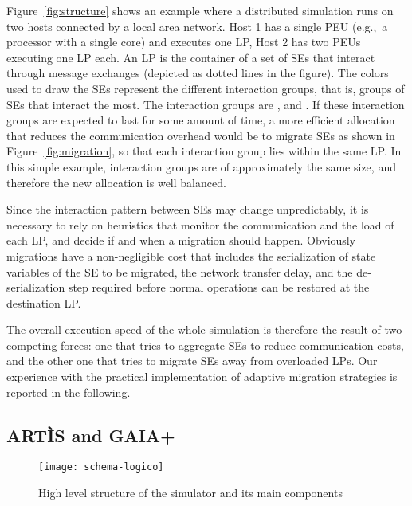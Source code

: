 \documentclass[1p]{elsarticle}
\begin{document}
Figure~\ref{fig:structure} shows an example where a distributed
simulation runs on two hosts connected by a local area network. Host 1
has a single PEU (e.g.,~a processor with a single core) and executes
one LP, Host 2 has two PEUs executing one LP each. An LP is the
container of a set of SEs that interact through message exchanges
(depicted as dotted lines in the figure).  The colors used to draw the
SEs represent the different interaction groups, that is, groups of SEs
that interact the most.  The interaction groups are ,  and .  If these interaction groups are expected to last
for some amount of time, a more efficient allocation that reduces the
communication overhead would be to migrate SEs as shown in
Figure~\ref{fig:migration}, so that each interaction group lies within
the same LP. In this simple example, interaction groups are of
approximately the same size, and therefore the new allocation is well
balanced.

Since the interaction pattern between SEs may change unpredictably, it
is necessary to rely on heuristics that monitor the communication and
the load of each LP, and decide if and when a migration should
happen. Obviously migrations have a non-negligible cost that includes
the serialization of state variables of the SE to be migrated, the
network transfer delay, and the de-serialization step required before
normal operations can be restored at the destination LP.

The overall execution speed of the whole simulation is therefore the
result of two competing forces: one that tries to aggregate SEs to
reduce communication costs, and the other one that tries to migrate
SEs away from overloaded LPs. Our experience with the practical
implementation of adaptive migration strategies is reported in the
following.

\subsection{ART\`IS and GAIA+}

\begin{figure}[ht]
\centering
\texttt{[image: schema-logico]}
\caption{High level structure of the simulator and its main components}
\label{fig_logicscheme}
\end{figure}
\end{document}
